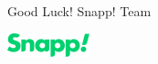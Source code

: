 \documentclass{article}
\begin{document}
Good Luck!
Snapp! Team

\vspace{1cm}
\includegraphics[width=.25\textwidth]{./snapp.png}
\end{document}
